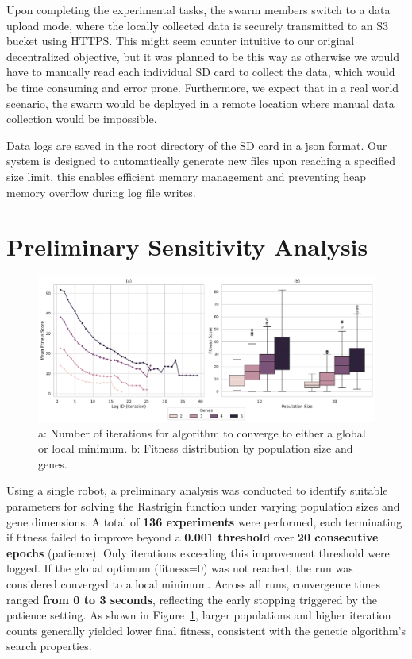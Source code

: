 \documentclass{report}
\begin{document}
Upon completing the experimental tasks, the swarm members switch to a data upload mode, where the locally collected data is securely transmitted to an S3 bucket using HTTPS. This might seem counter intuitive to our original decentralized objective, but it was planned to be this way as otherwise we would have to manually read each individual SD card to collect the data, which would be time consuming and error prone. Furthermore, we expect that in a real world scenario, the swarm would be deployed in a remote location where manual data collection would be impossible.

Data logs are saved in the root directory of the SD card in a \.json format. Our system is designed to automatically generate new files upon reaching a specified size limit, this enables efficient memory management and preventing heap memory overflow during log file writes.


\newpage
\section{Preliminary Sensitivity Analysis}

\begin{figure}[h]
    \centering
    \includegraphics[width=1\textwidth]{ga_prelim_analysis.pdf}
    \caption{a: Number of iterations for algorithm to converge to either a global or local minimum. b: Fitness distribution by population size and genes.}
    \label{fig:ga_prelim_analysis}
\end{figure}

Using a single robot, a preliminary analysis was conducted to identify suitable parameters for solving the Rastrigin function under varying population sizes and gene dimensions. A total of \textbf{136 experiments} were performed, each terminating if fitness failed to improve beyond a \textbf{0.001 threshold} over \textbf{20 consecutive epochs} (patience). %
Only iterations exceeding this improvement threshold were logged. If the global optimum (fitness=0) was not reached, the run was considered converged to a local minimum. Across all runs, convergence times ranged \textbf{from 0 to 3 seconds}, reflecting the early stopping triggered by the patience setting. As shown in Figure~\ref{fig:ga_prelim_analysis}, larger populations and higher iteration counts generally yielded lower final fitness, consistent with the genetic algorithm’s search properties.\\
\end{document}
